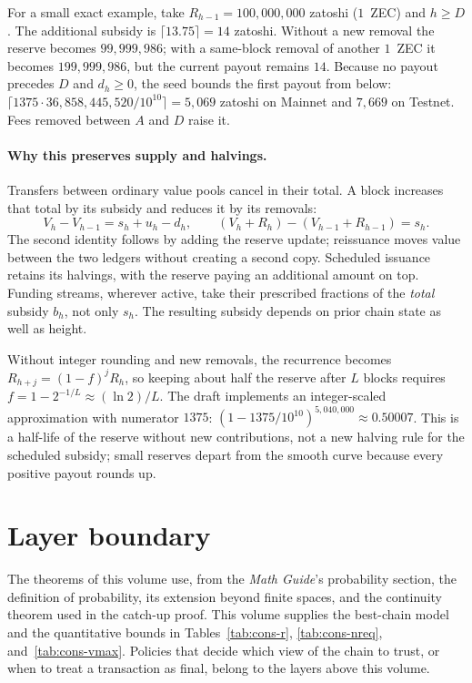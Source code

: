 \documentclass[11pt,a4paper]{article}
\theoremstyle{definition}
\begin{document}
For a small exact example, take $R_{h-1}=100{,}000{,}000$ zatoshi
($1$~ZEC) and $h\geq D$. The additional subsidy is
$\lceil13.75\rceil=14$ zatoshi. Without a new removal the reserve becomes
$99{,}999{,}986$; with a same-block removal of another $1$~ZEC it becomes
$199{,}999{,}986$, but the current payout remains $14$. Because no payout
precedes $D$ and $d_h\geq0$, the seed bounds the first payout from below:
$\lceil1375\cdot36{,}858{,}445{,}520/10^{10}\rceil=5{,}069$ zatoshi on
Mainnet and $7{,}669$ on Testnet. Fees removed between $A$ and $D$ raise it.

\paragraph{Why this preserves supply and halvings.}
Transfers between ordinary value pools cancel in their total. A block
increases that total by its subsidy and reduces it by its removals:
\[
 V_h-V_{h-1}=s_h+u_h-d_h,
 \qquad (V_h+R_h)-(V_{h-1}+R_{h-1})=s_h.
\]
The second identity follows by adding the reserve update; reissuance moves
value between the two ledgers without creating a second copy. Scheduled
issuance retains its halvings, with the reserve paying an additional
amount on top. Funding streams, wherever active, take their prescribed
fractions of the \emph{total} subsidy $b_h$, not only $s_h$. The resulting
subsidy depends on prior chain state as well as height.

Without integer rounding and new removals, the recurrence becomes
$R_{h+j}=(1-f)^jR_h$, so keeping about half the reserve after $L$ blocks
requires $f=1-2^{-1/L}\approx(\ln2)/L$. The draft implements an
integer-scaled approximation with numerator $1375$:
$(1-1375/10^{10})^{5{,}040{,}000}\approx0.50007$.
This is a half-life of the reserve without new contributions, not a new
halving rule for the scheduled subsidy; small reserves depart from the
smooth curve because every positive payout rounds up.

\section{Layer boundary}\label{sec:cons-relations}

The theorems of this volume use, from the \emph{Math Guide}'s probability
section, the definition of probability, its extension beyond finite spaces,
and the continuity theorem used in the catch-up proof. This volume supplies
the best-chain model and the quantitative bounds in Tables~\ref{tab:cons-r},
\ref{tab:cons-nreq}, and~\ref{tab:cons-vmax}. Policies that decide which view
of the chain to trust, or when to treat a transaction as final, belong to the
layers above this volume.
\end{document}
